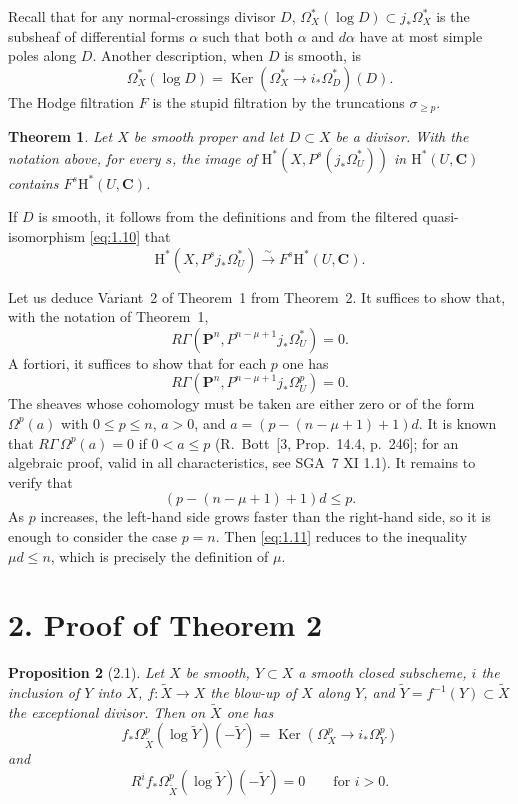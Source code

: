 \documentclass[11pt]{amsart}
\newtheorem{theorem}{Theorem}
\newtheorem{proposition}[theorem]{Proposition}
\theoremstyle{definition}
\DeclareMathOperator{\Ker}{Ker}
\begin{document}
Recall that for any normal-crossings divisor $D$, $\Omega_X^*(\log D)\subset j_*\Omega_X^*$ is the subsheaf of differential forms $\alpha$ such that both $\alpha$ and $d\alpha$ have at most simple poles along $D$. Another description, when $D$ is smooth, is
\[
\Omega_X^*(\log D) = \Ker(\Omega_X^*\to i_*\Omega_D^*)(D).
\]
The Hodge filtration $F$ is the stupid filtration by the truncations $\sigma_{\ge p}$.

\begin{theorem}
Let $X$ be smooth proper and let $D\subset X$ be a divisor. With the notation above, for every $s$, the image of $\mathrm H^*(X,P^s(j_*\Omega_U^*))$ in $\mathrm H^*(U,\mathbf C)$ contains $F^s\mathrm H^*(U,\mathbf C)$.
\end{theorem}

If $D$ is smooth, it follows from the definitions and from the filtered quasi-isomorphism \eqref{eq:1.10} that
\[
\mathrm H^*(X, P^s j_*\Omega_U^*) \xrightarrow{\sim} F^s\mathrm H^*(U,\mathbf C).
\]

Let us deduce Variant~2 of Theorem~1 from Theorem~2. It suffices to show that, with the notation of Theorem~1,
\[
R\Gamma(\mathbf P^n, P^{n-\mu+1}j_*\Omega_U^*) = 0.
\]
A fortiori, it suffices to show that for each $p$ one has
\[
R\Gamma(\mathbf P^n, P^{n-\mu+1}j_*\Omega_U^p)=0.
\]
The sheaves whose cohomology must be taken are either zero or of the form $\Omega^p(a)$ with $0\le p\le n$, $a>0$, and $a=(p-(n-\mu+1)+1)d$. It is known that $R\Gamma\,\Omega^p(a)=0$ if $0<a\le p$ (R.~Bott~[3, Prop.~14.4, p.~246]; for an algebraic proof, valid in all characteristics, see SGA~7 XI 1.1). It remains to verify that
\begin{equation}\label{eq:1.11}
(p-(n-\mu+1)+1)d \le p.
\tag{1.11}
\end{equation}
As $p$ increases, the left-hand side grows faster than the right-hand side, so it is enough to consider the case $p=n$. Then \eqref{eq:1.11} reduces to the inequality $\mu d\le n$, which is precisely the definition of $\mu$.

\section*{2. Proof of Theorem 2}

\begin{proposition}[2.1]
Let $X$ be smooth, $Y\subset X$ a smooth closed subscheme, $i$ the inclusion of $Y$ into $X$, $f:\widetilde X\to X$ the blow-up of $X$ along $Y$, and $\widetilde Y=f^{-1}(Y)\subset \widetilde X$ the exceptional divisor. Then on $\widetilde X$ one has
\[
f_*\Omega_{\widetilde X}^p(\log \widetilde Y)(-\widetilde Y) = \Ker(\Omega_X^p \to i_*\Omega_Y^p)
\]
and
\[
R^i f_*\Omega_{\widetilde X}^p(\log \widetilde Y)(-\widetilde Y)=0 \qquad\text{for } i>0.
\]
\end{proposition}
\end{document}
